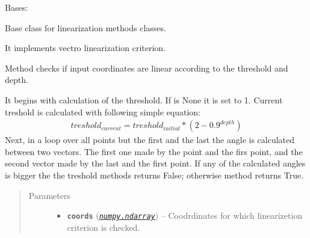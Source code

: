 \documentclass[a4paper,10pt,english]{sphinxmanual}
\begin{document}
\begin{fulllineitems}
\label{aqueduct.geom.traces:aqueduct.geom.traces.VectorLinearize}
Bases: \href{https://docs.python.org/2/library/functions.html\#object}{}

Base class for linearization methods classes.

It implements vectro linearization criterion.

\begin{fulllineitems}
\label{aqueduct.geom.traces:aqueduct.geom.traces.VectorLinearize.__init__}
\end{fulllineitems}


\begin{fulllineitems}
\label{aqueduct.geom.traces:aqueduct.geom.traces.VectorLinearize.is_linear_core}
Method checks if input coordinates are linear according to the threshold and depth.

It begins with calculation of the threshold. If  is None it is set to 1. Current treshold is calculated with following simple equation:
\begin{equation*}
\begin{split}treshold_{current} = treshold_{initial} * (2 - 0.9^{depth})\end{split}
\end{equation*}
Next, in a loop over all points but the first and the last the angle is calculated between two vectors. The first one made by the point and the firs point, and the second vector made by the last and the first point. If any of the calculated angles is bigger the the treshold methods returns False; otherwise method returns True.
\begin{quote}\begin{description}
\item[{Parameters}] \leavevmode\begin{itemize}
\item {} 
\textbf{\texttt{coords}} (\href{http://docs.scipy.org/doc/numpy/reference/generated/numpy.ndarray.html\#numpy.ndarray}{\emph{\texttt{numpy.ndarray}}}) -- Coodrdinates for which linearizetion criterion is checked.


\end{itemize}
\end{description}
\end{quote}
\end{fulllineitems}
\end{fulllineitems}
\end{document}
